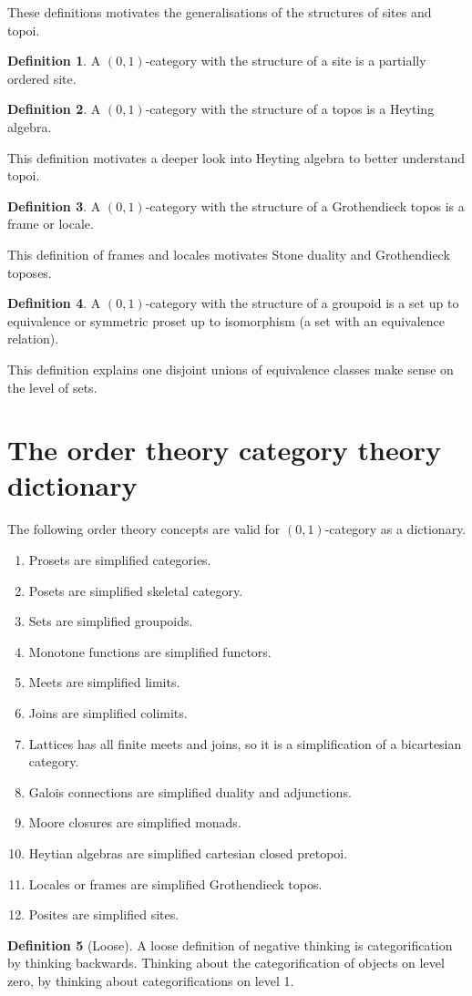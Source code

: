 \documentclass[10pt]{article}
\theoremstyle{plain}%
\theoremstyle{definition}
\newtheorem{definition}{Definition}[section]
\theoremstyle{remark}
\begin{document}
These definitions motivates the generalisations of the structures of sites and topoi.

\begin{definition}
	A $(0,1)$-category with the structure of a site is a partially ordered site. 
\end{definition}

\begin{definition}
	A $(0,1)$-category with the structure of a topos is a Heyting algebra. 
\end{definition}

This definition motivates a deeper look into Heyting algebra to better understand topoi.

\begin{definition}
	A $(0,1)$-category with the structure of a Grothendieck topos is a frame or locale. 
\end{definition}

This definition of frames and locales motivates Stone duality and Grothendieck toposes.

\begin{definition}
	A $(0,1)$-category with the structure of a groupoid is a set up to equivalence or symmetric proset up to isomorphism (a set with an equivalence relation).
\end{definition}

This definition explains one disjoint unions of equivalence classes make sense on the level of sets.

\section{The order theory category theory dictionary}

The following order theory concepts are valid for $(0,1)$-category as a dictionary.

\begin{enumerate}
	\item Prosets are simplified categories.
	\item Posets are simplified skeletal category.
	\item Sets are simplified groupoids.
	\item Monotone functions are simplified functors.
	\item Meets are simplified limits.
	\item Joins are simplified colimits.
	\item Lattices has all finite meets and joins, so it is a simplification of a bicartesian category.
	\item Galois connections are simplified duality and adjunctions.
	\item Moore closures are simplified monads.
	\item Heytian algebras are simplified cartesian closed pretopoi.
	\item Locales or frames are simplified Grothendieck topos.
	\item Posites are simplified sites.
\end{enumerate}

\begin{definition}[Loose]
	A loose definition of negative thinking is categorification by thinking backwards. Thinking about the categorification of objects on level zero, by thinking about categorifications on level 1.
\end{definition}
\end{document}

